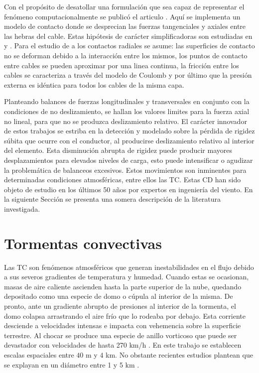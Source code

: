 Con el propósito de desatollar una formulación que sea capaz de representar el fenómeno computacionalmente se publicó el articulo \cite{Foti2016}. Aquí se implementa un modelo de contacto donde se desprecian las fuerzas tangenciales y axiales entre las hebras del cable. Estas hipótesis de carácter simplificadoras son estudiadas en \cite{costello1990average} y \cite{rawlins2005flexure}. Para el estudio de a los contactos radiales se asume: las superficies de contacto no se deforman debido a la interacción entre los mismos, los puntos de contacto entre cables se pueden aproximar por una linea continua, la fricción entre los cables se caracteriza a través del modelo de Coulomb y por último que la presión externa es idéntica para todos los cables de la misma capa. 

Planteando balances de fuerzas longitudinales y transversales en conjunto con la condiciones de no deslizamiento, se hallan los valores limites para la fuerza axial no lineal, para que no se produzca deslizamiento relativo.
El carácter innovador de estos trabajos se estriba en la detección y modelado sobre la pérdida de rigidez súbita que ocurre con el conductor, al producirse deslizamiento relativo al interior del elemento. Esta disminución  abrupta de rigidez puede producir mayores desplazamientos para elevados niveles de carga, esto puede intensificar o agudizar la problemática de balanceos excesivos. Estos movimientos son inminentes para determinadas condiciones atmosféricas, entre ellos las TC. Estas CD han sido objeto de estudio en los últimos 50 años por expertos en ingeniería del viento. En la siguiente Sección se presenta una somera descripción de la literatura investigada. 

\section{Tormentas convectivas}\label{Sec:EA:TormentasConvectivas}

Las TC son fenómenos atmosféricos que generan inestabilidades en el flujo debido a sus severos gradientes de temperatura y humedad. Cuando estas se ocasionan, masas de aire caliente ascienden hasta la parte superior de la nube, quedando depositado como una especie de domo o cúpula al interior de la misma. De pronto, ante un gradiente abrupto de presiones al interior de la tormenta, el domo colapsa arrastrando el aire frío que lo rodeaba por debajo. Esta corriente desciende a velocidades intensas e impacta con vehemencia sobre la superficie terrestre. Al chocar se produce una especie de anillo vorticoso que puede ser devastador con velocidades de hasta 270 km/h \textcite{fujita1985downburst}. En este trabajo se establecen escalas espaciales entre $40$ m  y $4$ km. No obstante recientes estudios plantean que se explayan en un diámetro entre 1 y 5 km \textcite{darwish2010dynamic}.

